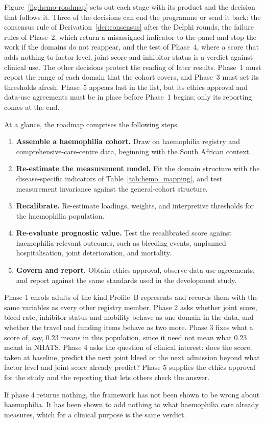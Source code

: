 Figure~\ref{fig:hemo-roadmap} sets out each stage with its product and the decision that follows it. Three of the decisions can end the programme or send it back: the consensus rule of Derivation~\ref{der:consensus} after the Delphi rounds, the failure rules of Phase~2, which return a misassigned indicator to the panel and stop the work if the domains do not reappear, and the test of Phase~4, where a score that adds nothing to factor level, joint score and inhibitor status is a verdict against clinical use. The other decisions protect the reading of later results. Phase~1 must report the range of each domain that the cohort covers, and Phase~3 must set its thresholds afresh. Phase~5 appears last in the list, but its ethics approval and data-use agreements must be in place before Phase~1 begins; only its reporting comes at the end.

At a glance, the roadmap comprises the following steps.

\begin{enumerate}
  \item \textbf{Assemble a haemophilia cohort.} Draw on haemophilia registry and comprehensive-care-centre data, beginning with the South African context.
  \item \textbf{Re-estimate the measurement model.} Fit the domain structure with the disease-specific indicators of Table~\ref{tab:hemo_mapping}, and test measurement invariance against the general-cohort structure.
  \item \textbf{Recalibrate.} Re-estimate loadings, weights, and interpretive thresholds for the haemophilia population.
  \item \textbf{Re-evaluate prognostic value.} Test the recalibrated score against haemophilia-relevant outcomes, such as bleeding events, unplanned hospitalisation, joint deterioration, and mortality.
  \item \textbf{Govern and report.} Obtain ethics approval, observe data-use agreements, and report against the same standards used in the development study.
\end{enumerate}

\begin{reading}
Phase 1 enrols adults of the kind Profile~B represents and records them with
the same variables as every other registry member. Phase 2 asks whether joint
score, bleed rate, inhibitor status and mobility behave as one domain in the
data, and
whether the travel and funding items behave as two more. Phase 3 fixes what a
score of, say, $0.23$ means in this population, since it need not mean what
$0.23$ meant in NHATS. Phase 4 asks the question of clinical interest: does
the score, taken at baseline, predict the next joint bleed or the next
admission beyond what factor level and joint score already predict? Phase 5
supplies the ethics approval for the study and the reporting that lets others
check the answer.

If phase 4 returns nothing, the framework has not been shown to be wrong about
haemophilia. It has been shown to add nothing to what haemophilia care already
measures, which for a clinical purpose is the same verdict.
\end{reading}


